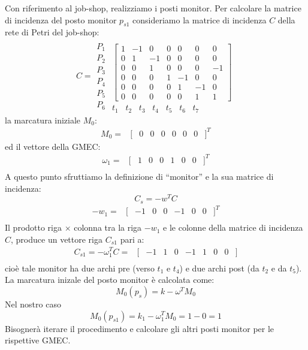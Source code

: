 \documentclass[a4paper]{report}
\begin{document}
Con riferimento al job-shop, realizziamo i posti monitor. Per
calcolare la matrice di incidenza del posto monitor $p_{s1}$
consideriamo la matrice di incidenza $C$ della rete di Petri del
job-shop:
\[
C =
\begin{array}{c}
  P_1\\
  P_2\\
  P_3\\
  P_4\\
  P_5\\
  P_6
\end{array}
\begin{array}{cc}
  \\
 \begin{bmatrix}
   1 & -1 & 0 & 0 & 0 & 0 & 0\\
   0 & 1 & -1 & 0 & 0 & 0 & 0\\
   0 & 0 & 1 & 0 & 0 & 0 & -1\\
   0 & 0 & 0 & 1 & -1 & 0 & 0\\
   0 & 0 & 0 & 0 & 1 & -1 & 0\\
   0 & 0 & 0 & 0 & 0 & 1 & 1
 \end{bmatrix}\\
  t_1\;\;\;t_2\;\;\;t_3\;\;\;t_4\;\;\;t_5\;\;\;t_6\;\;\;t_7
\end{array}
\]
la marcatura iniziale $M_0$:
\[
\begin{array}{ccccccccc}
  M_0 = & [ & 0 & 0 & 0 & 0 & 0 & 0 &]^T
\end{array}
\]
ed il vettore della GMEC:
\[
\begin{array}{ccccccccc}
  \omega_1 = & [ & 1 & 0 & 0 & 1 & 0 & 0 & ]^T\\
\end{array}
\]
A questo punto sfruttiamo la definizione di ``monitor'' e la sua
matrice di incidenza:
\begin{equation}\label{eq:matriceIncidenzaMonitor}
C_s = -w^T C
\end{equation}
\[
\begin{array}{ccccccccc}
  -w_1 = & [ & -1 & 0 & 0 & -1 & 0 & 0 & ]^T\\
\end{array}
\]
Il prodotto riga $\times$ colonna tra la riga $-w_1$ e le colonne
della matrice di incidenza $C$, produce un vettore riga $C_{s1}$ pari
a:
\[
\begin{array}{cccccccccc}
  C_{s1} = -\omega_1^T C= & [ & -1 & 1 & 0 & -1 & 1 & 0 & 0 &]\\
\end{array}
\]
cio\`e tale monitor ha due archi pre (verso $t_1$ e $t_4$) e due archi
post (da $t_2$ e da $t_5$). La marcatura inizale del posto monitor
\`e calcolata come:
\begin{equation}\label{eq:marcaturaInizialeMonitor}
M_0(p_s) = k -\omega^TM_0
\end{equation}
Nel nostro caso
\[
M_0(p_{s1}) = k_1 - \omega_1^T M_0 = 1 - 0 = 1
\]
Bisogner\`a iterare il procedimento e calcolare gli altri posti
monitor per le rispettive GMEC.
\end{document}
